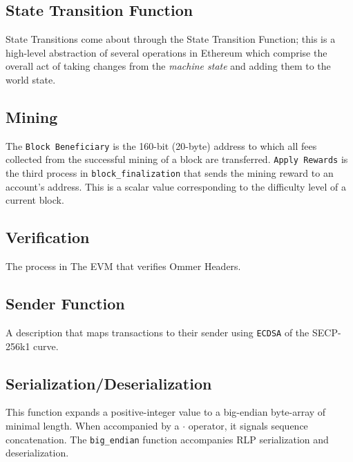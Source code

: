 \documentclass[10pt,letterpaper,leqno,bibliography=totoc]{scrartcl}
\newenvironment{alphafootnotes}
{\par\edef\savedfootnotenumber{\number\value{footnote}}
\renewcommand{\thefootnote}{\alph{footnote}}
\setcounter{footnote}{0}}
{\par\setcounter{footnote}{\savedfootnotenumber}}
\begin{document}
\begin{alphafootnotes}
\begin{multicols*}{2}
		\subsection{State Transition Function}
		State Transitions come about through the State Transition Function; this is a high-level abstraction of several operations in Ethereum which comprise the overall act of taking changes from  the \textit{machine state} and adding  them to the world state.
	
		\subsection{Mining}
			The \texttt{Block Beneficiary} is the 160-bit (20-byte) address to which all fees collected from the successful mining of a block are transferred. \texttt{Apply Rewards} is the third process in \texttt{block\_finalization} that sends the mining reward to an account's address. This is a scalar value corresponding to the difficulty level of a current block. 

		\subsection{Verification}
			The process in The EVM that verifies Ommer Headers.


		\subsection{Sender Function} A description that maps transactions to their sender using \texttt{ECDSA} of the SECP-256k1 curve.

		\subsection{Serialization/Deserialization}
			This function expands a positive-integer value to a big-endian byte-array of minimal length. When accompanied by a $\cdot$ operator, it signals sequence concatenation.  The \texttt{big\_endian} function  accompanies RLP serialization and deserialization.

\end{multicols*}
\end{alphafootnotes}
\end{document}
